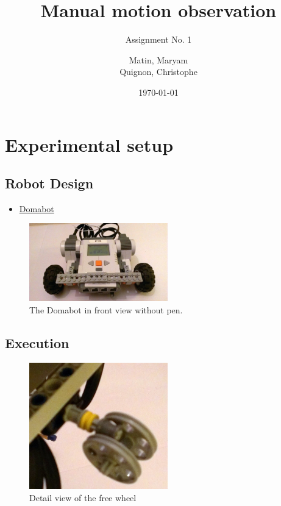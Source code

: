 \documentclass{scrartcl}
\begin{document}
\title{Manual motion observation}
\subtitle{Assignment No. 1}
\author{
  Matin, Maryam \\
  Quignon, Christophe
} 
\date{\today}


\maketitle



\section{Experimental setup}
\subsection{Robot Design}
\begin{itemize}
\item \href{http://www.damienkee.com/home/2011/8/20/domabot-classroom-robot-design.html}{Domabot}
\end{itemize}

\begin{figure}
 \center
 \includegraphics[width= 6cm]{img/robot_front.jpg}
 \caption{The Domabot in front view without pen.}
 \label{fig:front_view}
\end{figure}

\subsection{Execution}
\begin{figure}
 \center
 \includegraphics[width= 6cm]{img/steering_wheel.jpg}
 \caption{Detail view of the free wheel}
 \label{fig:free_wheel}
\end{figure}
\end{document}
